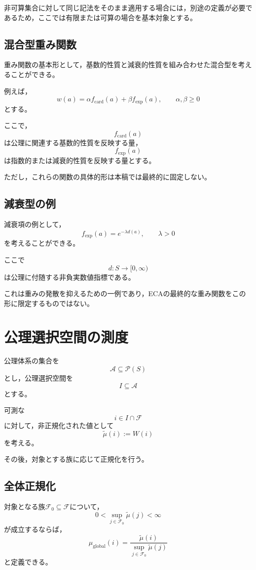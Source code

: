 \documentclass[12pt,a4paper]{article}
\begin{document}
非可算集合に対して同じ記法をそのまま適用する場合には，別途の定義が必要であるため，ここでは有限または可算の場合を基本対象とする。

\subsection{混合型重み関数}

重み関数の基本形として，基数的性質と減衰的性質を組み合わせた混合型を考えることができる。

例えば，
\[
w(a)
=
\alpha f_{\mathrm{card}}(a)
+
\beta f_{\mathrm{exp}}(a),
\qquad
\alpha,\beta\geq0
\]
とする。

ここで，
\[
f_{\mathrm{card}}(a)
\]
は公理に関連する基数的性質を反映する量，
\[
f_{\mathrm{exp}}(a)
\]
は指数的または減衰的性質を反映する量とする。

ただし，これらの関数の具体的形は本稿では最終的に固定しない。

\subsection{減衰型の例}

減衰項の例として，
\[
f_{\mathrm{exp}}(a)
=
e^{-\lambda d(a)},
\qquad
\lambda>0
\]
を考えることができる。

ここで
\[
d:S\to[0,\infty)
\]
は公理に付随する非負実数値指標である。

これは重みの発散を抑えるための一例であり，ECAの最終的な重み関数をこの形に限定するものではない。

\section{公理選択空間の測度}

公理体系の集合を
\[
\mathscr A\subseteq\mathcal P(S)
\]
とし，公理選択空間を
\[
I\subseteq\mathscr A
\]
とする。

可測な
\[
i\in I\cap\mathcal F
\]
に対して，非正規化された値として
\[
\widetilde\mu(i):=W(i)
\]
を考える。

その後，対象とする族に応じて正規化を行う。

\subsection{全体正規化}

対象となる族$\mathcal F_0\subseteq\mathcal F$について，
\[
0<
\sup_{j\in\mathcal F_0}\widetilde\mu(j)
<\infty
\]
が成立するならば，
\[
\mu_{\mathrm{global}}(i)
=
\frac{\widetilde\mu(i)}
{\sup_{j\in\mathcal F_0}\widetilde\mu(j)}
\]
と定義できる。
\end{document}
